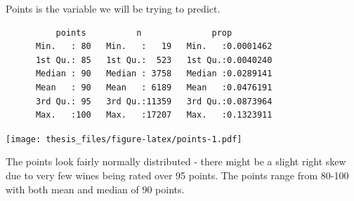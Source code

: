 \documentclass[12pt,twoside]{amherstthesis}
\newenvironment{Shaded}{\begin{snugshade}}{\end{snugshade}}
\newcommand{\KeywordTok}[1]{\textcolor[rgb]{0.13,0.29,0.53}{\textbf{#1}}}
\newcommand{\DataTypeTok}[1]{\textcolor[rgb]{0.13,0.29,0.53}{#1}}
\newcommand{\StringTok}[1]{\textcolor[rgb]{0.31,0.60,0.02}{#1}}
\newcommand{\OtherTok}[1]{\textcolor[rgb]{0.56,0.35,0.01}{#1}}
\newcommand{\OperatorTok}[1]{\textcolor[rgb]{0.81,0.36,0.00}{\textbf{#1}}}
\newcommand{\NormalTok}[1]{#1}
\begin{document}
Points is the variable we will be trying to predict.
\begin{Shaded}
\end{Shaded}
\begin{verbatim}
          points          n              prop          
      Min.   : 80   Min.   :   19   Min.   :0.0001462  
      1st Qu.: 85   1st Qu.:  523   1st Qu.:0.0040240  
      Median : 90   Median : 3758   Median :0.0289141  
      Mean   : 90   Mean   : 6189   Mean   :0.0476191  
      3rd Qu.: 95   3rd Qu.:11359   3rd Qu.:0.0873964  
      Max.   :100   Max.   :17207   Max.   :0.1323911
\end{verbatim}
\begin{Shaded}
\end{Shaded}
\texttt{[image: thesis\_files/figure-latex/points-1.pdf]}

The points look fairly normally distributed - there might be a slight
right skew due to very few wines being rated over 95 points. The points
range from 80-100 with both mean and median of 90 points.
\end{document}
